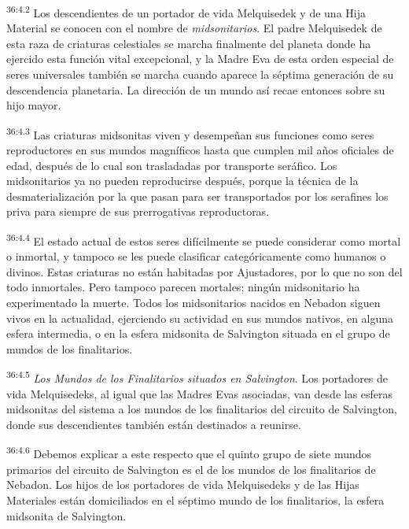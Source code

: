 \par
\textsuperscript{36:4.2} Los descendientes de un portador de vida Melquisedek y de una Hija Material se conocen con el nombre de \textit{midsonitarios}. El padre Melquisedek de esta raza de criaturas celestiales se marcha finalmente del planeta donde ha ejercido esta función vital excepcional, y la Madre Eva de esta orden especial de seres universales también se marcha cuando aparece la séptima generación de su descendencia planetaria. La dirección de un mundo así recae entonces sobre su hijo mayor.

\par
\textsuperscript{36:4.3} Las criaturas midsonitas viven y desempeñan sus funciones como seres reproductores en sus mundos magníficos hasta que cumplen mil años oficiales de edad, después de lo cual son trasladadas por transporte seráfico. Los midsonitarios ya no pueden reproducirse después, porque la técnica de la desmaterialización por la que pasan para ser transportados por los serafines los priva para siempre de sus prerrogativas reproductoras.

\par
\textsuperscript{36:4.4} El estado actual de estos seres difícilmente se puede considerar como mortal o inmortal, y tampoco se les puede clasificar categóricamente como humanos o divinos. Estas criaturas no están habitadas por Ajustadores, por lo que no son del todo inmortales. Pero tampoco parecen mortales; ningún midsonitario ha experimentado la muerte. Todos los midsonitarios nacidos en Nebadon siguen vivos en la actualidad, ejerciendo su actividad en sus mundos nativos, en alguna esfera intermedia, o en la esfera midsonita de Salvington situada en el grupo de mundos de los finalitarios.

\par
\textsuperscript{36:4.5} \textit{Los Mundos de los Finalitarios situados en Salvington}. Los portadores de vida Melquisedeks, al igual que las Madres Evas asociadas, van desde las esferas midsonitas del sistema a los mundos de los finalitarios del circuito de Salvington, donde sus descendientes también están destinados a reunirse.

\par
\textsuperscript{36:4.6} Debemos explicar a este respecto que el quinto grupo de siete mundos primarios del circuito de Salvington es el de los mundos de los finalitarios de Nebadon. Los hijos de los portadores de vida Melquisedeks y de las Hijas Materiales están domiciliados en el séptimo mundo de los finalitarios, la esfera midsonita de Salvington.

